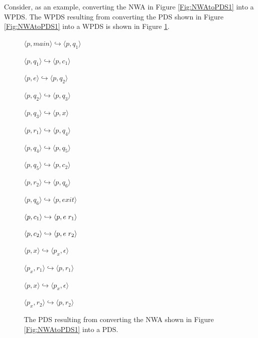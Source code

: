 \noindent Consider, as an example, converting the NWA in Figure
\ref{Fig:NWAtoPDS1} into a WPDS.  The WPDS resulting from converting the PDS
shown in Figure \ref{Fig:NWAtoPDS1} into a WPDS is shown in Figure
\ref{Fig:NWAtoPDS2}. \\

\begin{figure}[htbp]
  \centering
    \begin{description}
      \centering
      \item{ $\langle p,main \rangle \hookrightarrow \langle p,q_1 \rangle$}
      \item{ $\langle p,q_1 \rangle \hookrightarrow \langle p,c_1 \rangle$}
      \item{ $\langle p,e \rangle \hookrightarrow \langle p,q_2 \rangle$}
      \item{ $\langle p,q_2 \rangle \hookrightarrow \langle p,q_3 \rangle$}
      \item{ $\langle p,q_3 \rangle \hookrightarrow \langle p,x \rangle$}
      \item{ $\langle p,r_1 \rangle \hookrightarrow \langle p,q_4 \rangle$}
      \item{ $\langle p,q_4 \rangle \hookrightarrow \langle p,q_5 \rangle$}
      \item{ $\langle p,q_5 \rangle \hookrightarrow \langle p,c_2 \rangle$}
      \item{ $\langle p,r_2 \rangle \hookrightarrow \langle p,q_6 \rangle$}
      \item{ $\langle p,q_6 \rangle \hookrightarrow \langle p,exit \rangle$}
      \item{ $\langle p,c_1 \rangle \hookrightarrow \langle p,e \hspace{.1cm} r_1 \rangle$}
      \item{ $\langle p,c_2 \rangle \hookrightarrow \langle p,e \hspace{.1cm} r_2 \rangle$}
      \item{ $\langle p,x \rangle \hookrightarrow \langle p_x, \epsilon \rangle$}
      \item{ $\langle p_x,r_1 \rangle \hookrightarrow \langle p,r_1 \rangle$}
      \item{ $\langle p,x \rangle \hookrightarrow \langle p_x, \epsilon \rangle$}
      \item{ $\langle p_x,r_2 \rangle \hookrightarrow \langle p,r_2 \rangle$}
    \end{description}
  \caption{The PDS resulting from converting the NWA shown in Figure \ref{Fig:NWAtoPDS1} into a PDS.}
  \label{Fig:NWAtoPDS2}
\end{figure}

